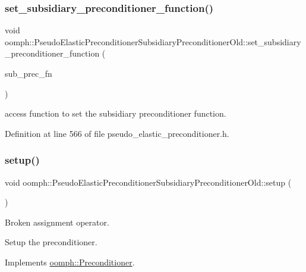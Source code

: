\subsubsection{\texorpdfstring{set\+\_\+subsidiary\+\_\+preconditioner\+\_\+function()}{set\_subsidiary\_preconditioner\_function()}}
{\footnotesize\ttfamily void oomph\+::\+Pseudo\+Elastic\+Preconditioner\+Subsidiary\+Preconditioner\+Old\+::set\+\_\+subsidiary\+\_\+preconditioner\+\_\+function (\begin{DoxyParamCaption}\item[{\hyperlink{classoomph_1_1PseudoElasticPreconditionerSubsidiaryPreconditionerOld_a2ee5b7ddad26a4eb6662e2b701ab0a52}{Subsidiary\+Preconditioner\+Fct\+Pt}}]{sub\+\_\+prec\+\_\+fn }\end{DoxyParamCaption})\hspace{0.3cm}{\ttfamily [inline]}}



access function to set the subsidiary preconditioner function. 



Definition at line 566 of file pseudo\+\_\+elastic\+\_\+preconditioner.\+h.

\mbox{\label{classoomph_1_1PseudoElasticPreconditionerSubsidiaryPreconditionerOld_a532201f17edc43b3b475fff2d2744b8b}} 
\subsubsection{\texorpdfstring{setup()}{setup()}}
{\footnotesize\ttfamily void oomph\+::\+Pseudo\+Elastic\+Preconditioner\+Subsidiary\+Preconditioner\+Old\+::setup (\begin{DoxyParamCaption}{ }\end{DoxyParamCaption})\hspace{0.3cm}{\ttfamily [virtual]}}



Broken assignment operator. 

Setup the preconditioner. 

Implements \hyperlink{classoomph_1_1Preconditioner_af4886f4efe510e5c9b0eb19422943588}{oomph\+::\+Preconditioner}.



